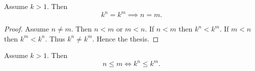 \documentclass[../../natural-numbers.ftl.tex]{subfiles}
\begin{document}
\begin{forthel}
    \begin{corollary}[NN 02 04 837306]
      Assume $k > 1$.
      Then
      $$k^{n} = k^{m} \implies n = m.$$
    \end{corollary}
    \begin{proof}
      Assume $n \neq m$.
      Then $n < m$ or $m < n$.
      If $n < m$ then $k^{n} < k^{m}$.
      If $m < n$ then $k^{m} < k^{n}$.
      Thus $k^{n} \neq k^{m}$.
      Hence the thesis.
    \end{proof}


    \begin{corollary}[NN 02 04 734298]
      Assume $k > 1$.
      Then
      $$n \leq m \iff k^{n} \leq k^{m}.$$
    \end{corollary}
  \end{forthel}
\end{document}

